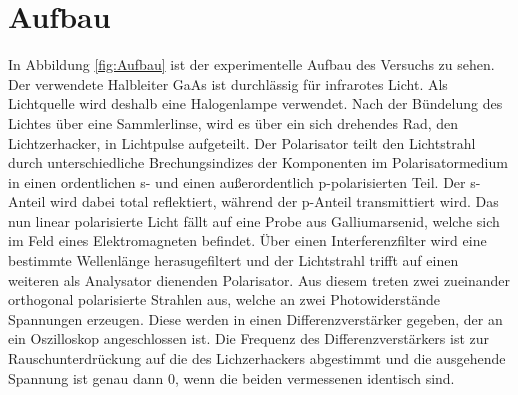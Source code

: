 \section{Aufbau}
\label{sec:Aufbau}

In Abbildung \ref{fig:Aufbau} ist der experimentelle Aufbau des Versuchs zu sehen.
Der verwendete Halbleiter GaAs ist durchlässig für infrarotes Licht.
Als Lichtquelle wird deshalb eine Halogenlampe verwendet.
Nach der Bündelung des Lichtes über eine Sammlerlinse, wird es über ein sich drehendes Rad, den Lichtzerhacker, in Lichtpulse aufgeteilt.
Der Polarisator teilt den Lichtstrahl durch unterschiedliche Brechungsindizes der Komponenten im Polarisatormedium in einen ordentlichen s- und einen außerordentlich p-polarisierten Teil. Der s-Anteil wird dabei total reflektiert, während der p-Anteil transmittiert wird.
Das nun linear polarisierte Licht fällt auf eine Probe aus Galliumarsenid, welche sich im Feld eines Elektromagneten befindet. Über einen Interferenzfilter wird eine bestimmte Wellenlänge herasugefiltert und der Lichtstrahl trifft auf einen weiteren als Analysator dienenden Polarisator. Aus diesem treten zwei zueinander orthogonal polarisierte Strahlen aus, welche an zwei Photowiderstände Spannungen erzeugen.
Diese werden in einen Differenzverstärker gegeben, der an ein Oszilloskop angeschlossen ist. Die Frequenz des Differenzverstärkers ist zur Rauschunterdrückung auf die des Lichzerhackers abgestimmt und die ausgehende Spannung ist genau dann $0$, wenn die beiden vermessenen identisch sind.

